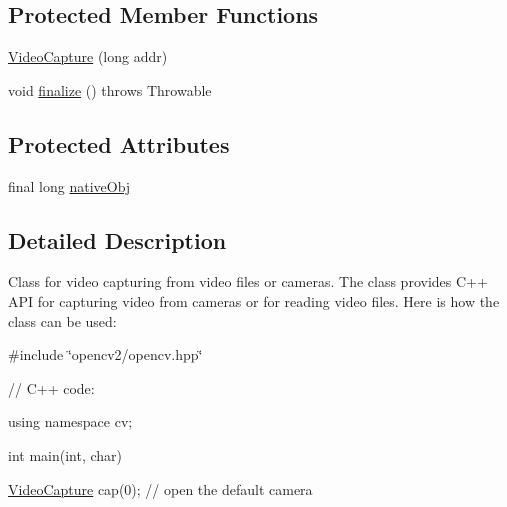\subsection*{Protected Member Functions}
\begin{DoxyCompactItemize}
\item 
\mbox{\hyperlink{classorg_1_1opencv_1_1highgui_1_1_video_capture_a64df16f6351123a0c1040c00d23a2db8}{Video\+Capture}} (long addr)
\item 
void \mbox{\hyperlink{classorg_1_1opencv_1_1highgui_1_1_video_capture_a13e45dabaaaabe98c0eb1138e2846f03}{finalize}} ()  throws Throwable 
\end{DoxyCompactItemize}
\subsection*{Protected Attributes}
\begin{DoxyCompactItemize}
\item 
final long \mbox{\hyperlink{classorg_1_1opencv_1_1highgui_1_1_video_capture_a370c3d9b73ba1c8267f10d77c2ea9d11}{native\+Obj}}
\end{DoxyCompactItemize}


\subsection{Detailed Description}
Class for video capturing from video files or cameras. The class provides C++ A\+PI for capturing video from cameras or for reading video files. Here is how the class can be used\+:

\#include \char`\"{}opencv2/opencv.\+hpp\char`\"{} {\ttfamily }

{\ttfamily }

{\ttfamily }

{\ttfamily // C++ code\+:}

{\ttfamily }

{\ttfamily }

{\ttfamily using namespace cv;}

{\ttfamily }

{\ttfamily }

{\ttfamily int main(int, char)}

{\ttfamily }

{\ttfamily }

{\ttfamily \mbox{\hyperlink{classorg_1_1opencv_1_1highgui_1_1_video_capture}{Video\+Capture}} cap(0); // open the default camera}

{\ttfamily }

